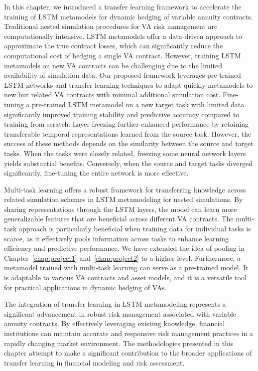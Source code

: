 In this chapter, we introduced a transfer learning framework to accelerate the training of LSTM metamodels for dynamic hedging of variable annuity contracts.
Traditional nested simulation procedures for VA risk management are computationally intensive.
LSTM metamodels offer a data-driven approach to approximate the true contract losses, which can significantly reduce the computational cost of hedging a single VA contract.
However, training LSTM metamodels on new VA contracts can be challenging due to the limited availability of simulation data.
Our proposed framework leverages pre-trained LSTM networks and transfer learning techniques to adapt quickly metamodels to new but related VA contracts with minimal additional simulation cost.
Fine-tuning a pre-trained LSTM metamodel on a new target task with limited data significantly improved training stability and predictive accuracy compared to training from scratch. 
Layer freezing further enhanced performance by retaining transferable temporal representations learned from the source task. 
However, the success of these methods depends on the similarity between the source and target tasks. 
When the tasks were closely related, freezing some neural network layers yields substantial benefits. 
Conversely, when the source and target tasks diverged significantly, fine-tuning the entire network is more effective.

Multi-task learning offers a robust framework for transferring knowledge across related simulation schemes in LSTM metamodeling for nested simulations. 
By sharing representations through the LSTM layers, the model can learn more generalizable features that are beneficial across different VA contracts. 
The multi-task approach is particularly beneficial when training data for individual tasks is scarce, as it effectively pools information across tasks to enhance learning efficiency and predictive performance.
We have extended the idea of pooling in Chapter~\ref{chap:project1} and~\ref{chap:project2} to a higher level.
Furthermore, a metamodel trained with multi-task learning can serve as a pre-trained model. 
It is adaptable to various VA contracts and asset models, and it is a versatile tool for practical applications in dynamic hedging of VAs.

The integration of transfer learning in LSTM metamodeling represents a significant advancement in robust risk management associated with variable annuity contracts.
By effectively leveraging existing knowledge, financial institutions can maintain accurate and responsive risk management practices in a rapidly changing market environment. 
The methodologies presented in this chapter attempt to make a significant contribution to the broader applications of transfer learning in financial modeling and risk assessment.

